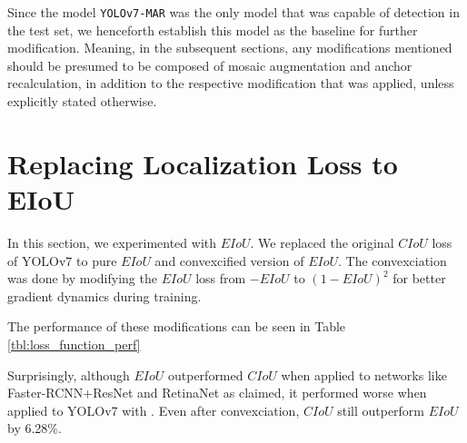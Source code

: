 Since the model \verb|YOLOv7-MAR| was the only model that was capable of detection in the test set,
we henceforth establish this model as the baseline for further modification. Meaning, in the subsequent
sections, any modifications mentioned should be presumed to be composed of mosaic augmentation and anchor recalculation,
in addition to the respective modification that was applied, unless explicitly stated otherwise.



\section{Replacing Localization Loss to EIoU}
In this section, we experimented with $EIoU$.
We replaced the original $CIoU$ loss of YOLOv7 to pure $EIoU$ and convexcified version of $EIoU$.
The convexciation was done by modifying the $EIoU$ loss from $-EIoU$ to $(1-EIoU)^2$ for better
gradient dynamics during training.

The performance of these modifications can be seen in Table \ref{tbl:loss_function_perf}

\begin{table}[b]
  \centering
  \label{tbl:loss_function_perf}
  \vspace{-1ex}
  
\end{table}

Surprisingly, although $EIoU$ outperformed $CIoU$ when applied to networks like Faster-RCNN+ResNet and RetinaNet
as \textcite{eiou} claimed, it performed worse when applied to YOLOv7 with \textcite{aot_dataset}.
Even after convexciation, $CIoU$ still outperform $EIoU$ by 6.28\%.

